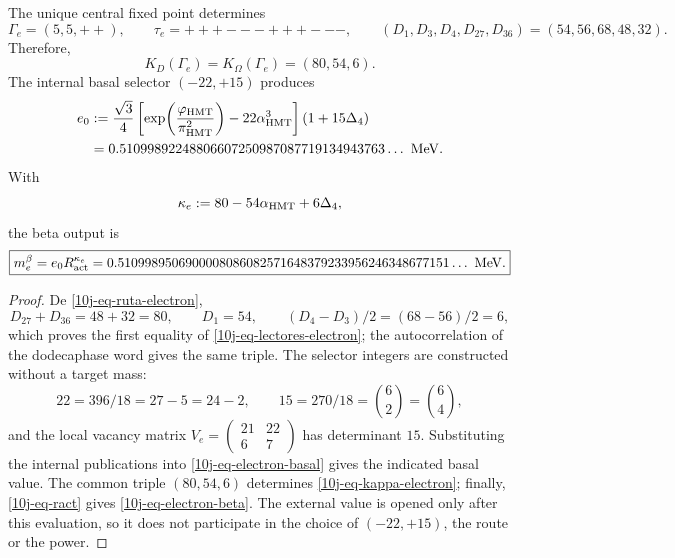 \begin{theorem}
\label{10j-thm-electron}
The unique central fixed point determines
\begin{equation}
 \Gamma_e=(5,5,++),
 \qquad \tau_e=+++---+++---,
 \qquad
 (D_1,D_3,D_4,D_{27},D_{36})=(54,56,68,48,32).
 \label{10j-eq-ruta-electron}
\end{equation}
Therefore,
\begin{equation}
 K_D(\Gamma_e)=K_\Omega(\Gamma_e)=(80,54,6).
 \label{10j-eq-lectores-electron}
\end{equation}
The internal basal selector \((-22,+15)\) produces
\begin{equation}
\begin{aligned}
 e_0&:=\frac{\sqrt3}{4}
 \left[
  \exp\!\left(\frac{\varphi_{\rm HMT}}{\pi_{\rm HMT}^2}\right)
  -22\alpha_{\rm HMT}^3
 \right](1+15\Delta_4)\\
 &=0.51099892248806607250987087719134943763\ldots\ {\rm MeV}.
\end{aligned}
 \label{10j-eq-electron-basal}
\end{equation}
With
\begin{equation}
 \kappa_e:=80-54\alpha_{\rm HMT}+6\Delta_4,
 \label{10j-eq-kappa-electron}
\end{equation}
the beta output is
\begin{equation}
 \boxed{
 m_e^\beta=e_0R_{\rm act}^{\kappa_e}
 =0.5109989506900008086082571648379233956246348677151\ldots\ {\rm MeV}.}
 \label{10j-eq-electron-beta}
\end{equation}
\end{theorem}

\begin{proof}
De \eqref{10j-eq-ruta-electron},
\[
 D_{27}+D_{36}=48+32=80,
 \qquad D_1=54,
 \qquad (D_4-D_3)/2=(68-56)/2=6,
\]
which proves the first equality of \eqref{10j-eq-lectores-electron}; the autocorrelation of the dodecaphase word gives the same triple. The selector integers are constructed without a target mass:
\begin{equation}
 22=396/18=27-5=24-2,
 \qquad 15=270/18=\binom62=\binom64,
 \label{10j-eq-genealogia-22-15}
\end{equation}
and the local vacancy matrix \(
 V_e=\left(\begin{smallmatrix}21&22\\6&7\end{smallmatrix}\right)
\)
has determinant \(15\). Substituting the internal publications into \eqref{10j-eq-electron-basal} gives the indicated basal value. The common triple \((80,54,6)\) determines \eqref{10j-eq-kappa-electron}; finally, \eqref{10j-eq-ract} gives \eqref{10j-eq-electron-beta}. The external value is opened only after this evaluation, so it does not participate in the choice of \((-22,+15)\), the route or the power.
\end{proof}

